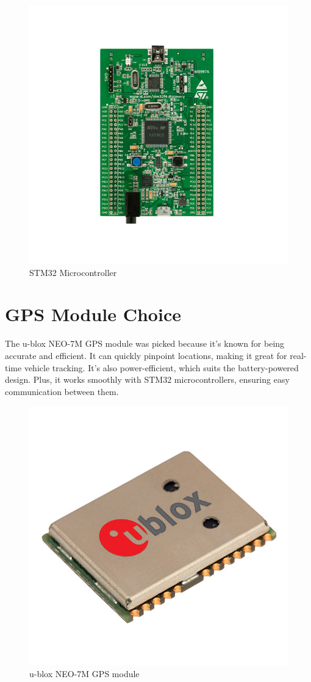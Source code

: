 \documentclass[conference]{IEEEtran}
\begin{document}
\begin{figure}
  \centering
  \includegraphics[width=0.7\columnwidth]{STM32.jpg}
  \caption{STM32 Microcontroller}
\end{figure}


\section{GPS Module Choice}
The u-blox NEO-7M GPS module was picked because it's known for being accurate and efficient. It can quickly pinpoint locations, making it great for real-time vehicle tracking. It's also power-efficient, which suits the battery-powered design. Plus, it works smoothly with STM32 microcontrollers, ensuring easy communication between them.

\begin{figure}
  \centering
  \includegraphics[width=0.7\columnwidth]{u-blox.jpg}
  \caption{u-blox NEO-7M GPS module }
\end{figure}
\end{document}
